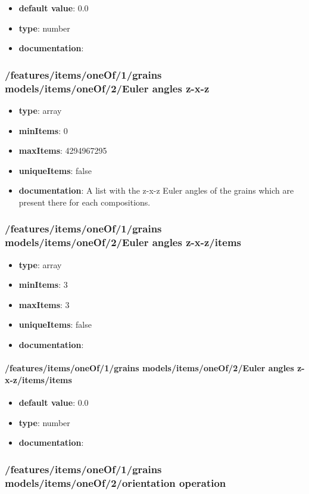 \begin{itemize}\item {\bf default value}: 0.0
\item {\bf type}: number
\item {\bf documentation}: 
\end{itemize}\subsubsection{/features/items/oneOf/1/grains models/items/oneOf/2/Euler angles z-x-z}
\begin{itemize}\item {\bf type}: array
\item {\bf minItems}: 0
\item {\bf maxItems}: 4294967295
\item {\bf uniqueItems}: false
\item {\bf documentation}: A list with the z-x-z Euler angles of the grains which are present there for each compositions.
\end{itemize}\subsubsection{/features/items/oneOf/1/grains models/items/oneOf/2/Euler angles z-x-z/items}
\begin{itemize}\item {\bf type}: array
\item {\bf minItems}: 3
\item {\bf maxItems}: 3
\item {\bf uniqueItems}: false
\item {\bf documentation}: 
\end{itemize}\paragraph{/features/items/oneOf/1/grains models/items/oneOf/2/Euler angles z-x-z/items/items}
\begin{itemize}\item {\bf default value}: 0.0
\item {\bf type}: number
\item {\bf documentation}: 
\end{itemize}\subsubsection{/features/items/oneOf/1/grains models/items/oneOf/2/orientation operation}
